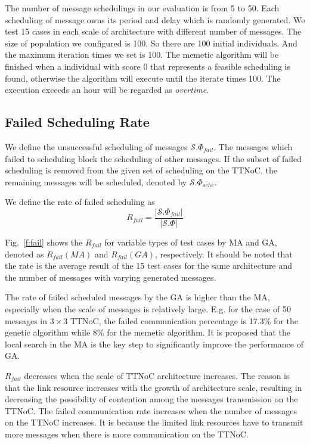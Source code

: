 \documentclass[journal]{IEEEtran}
\newcommand{\calS}{\mathcal{S}}
\theoremstyle{remark}
\begin{document}
The number of message schedulings in our evaluation is from 5 to 50.
Each scheduling of message owns its period and delay which is randomly generated.
We test 15 cases in each scale of architecture with different number of messages.
The size of population we configured is 100.
So there are 100 initial individuals.
And the maximum iteration times we set is 100.
The memetic algorithm will be finished when a individual with score 0 that represents a feasible scheduling is found,
 otherwise the algorithm will execute until the iterate times 100.
The execution exceeds an hour will be regarded as \emph{overtime}.

\subsection{Failed Scheduling Rate}
We define the unsuccessful scheduling of messages $\calS.\Phi_{fail}$.
The messages which failed to scheduling block the scheduling of other messages.
If the subset of failed scheduling is removed from the given set of scheduling on the TTNoC,
 the remaining messages will be scheduled, denoted by $\calS.\Phi_{sche}$.

We define the rate of failed scheduling as
\begin{equation}
	R_{fail} = \frac{|\calS.\Phi_{fail}|}{|\calS.\Phi|}
\end{equation}

Fig.~\ref{f:fail} shows the $R_{fail}$ for variable types of test cases by MA and GA, denoted as $R_{fail}({MA})$ and $R_{fail}(GA)$, respectively. 
It should be noted that the rate is the average result of the 15 test cases for the same architecture and the number of messages with varying generated messages.

The rate of failed scheduled messages by the GA is higher than the MA, especially when the scale of messages is relatively large.
E.g. for the case of 50 messages in $3\times 3$ TTNoC,
 the failed communication percentage is 17.3\% for the genetic algorithm while 8\% for the memetic algorithm.
It is proposed that the local search in the MA is the key step to significantly improve the performance of GA.

$R_{fail}$ decreases when the scale of TTNoC architecture increases. 
The reason is that the link resource increases with the growth of architecture scale,
 resulting in decreasing the possibility of contention among the messages transmission on the TTNoC.
The failed communication rate increases when the number of messages on the TTNoC increases.
It is because the limited link resources have to transmit more messages when there is more communication on the TTNoC.
\end{document}
